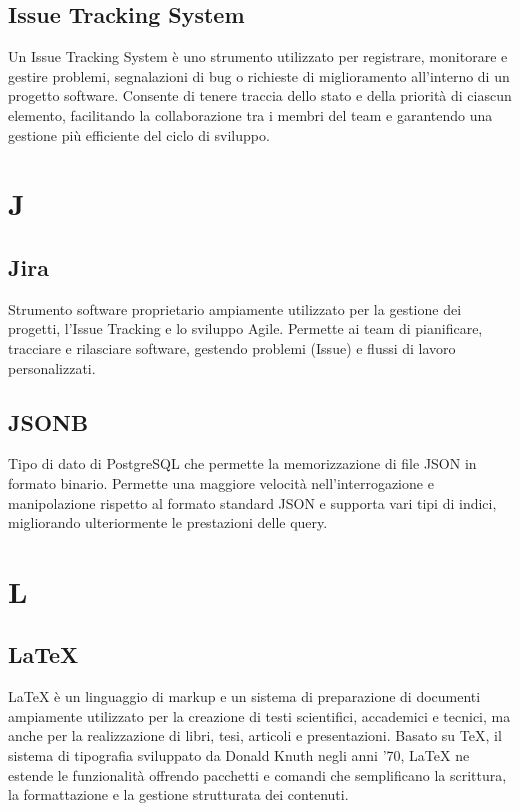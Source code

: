 \documentclass[10pt, letterpaper]{article}
\begin{document}
\subsection*{Issue Tracking System}
Un Issue Tracking System è uno strumento utilizzato per registrare, monitorare e gestire problemi, segnalazioni di bug o richieste di miglioramento all'interno
di un progetto software. Consente di tenere traccia dello stato e della priorità di ciascun elemento, facilitando la collaborazione tra i membri del team e
garantendo una gestione più efficiente del ciclo di sviluppo.

\section{J}

\subsection*{Jira}
Strumento software proprietario ampiamente utilizzato per la gestione dei progetti, l'Issue Tracking e lo sviluppo Agile. Permette ai team di pianificare,
tracciare e rilasciare software, gestendo problemi (Issue) e flussi di lavoro personalizzati.

\subsection*{JSONB}
Tipo di dato di PostgreSQL che permette la memorizzazione di file JSON in formato binario. Permette una maggiore velocità nell'interrogazione e manipolazione rispetto al formato standard JSON e supporta vari tipi di indici, migliorando ulteriormente le prestazioni delle query.

\section{L}

\subsection*{LaTeX}
LaTeX è un linguaggio di markup e un sistema di preparazione di documenti ampiamente utilizzato per la creazione di testi scientifici, accademici e tecnici,
ma anche per la realizzazione di libri, tesi, articoli e presentazioni. Basato su TeX, il sistema di tipografia sviluppato da Donald Knuth negli anni '70,
LaTeX ne estende le funzionalità offrendo pacchetti e comandi che semplificano la scrittura, la formattazione e la gestione strutturata dei contenuti.
\end{document}
